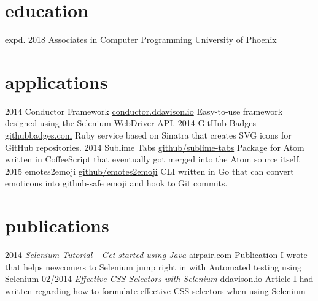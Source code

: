\documentclass[]{ddavison-resume}
\begin{document}
\section{education}

\begin{entrylist}
  \entry
    {expd. 2018}
    {Associates {\normalfont in Computer Programming}}
    {University of Phoenix}
    {}
\end{entrylist}

\section{applications}

\begin{entrylist}
  \entry
    {2014}
    {Conductor Framework}
    {\href{https://conductor.ddavison.io}{conductor.ddavison.io}}
    {Easy-to-use framework designed using the Selenium WebDriver API.}
  \entry
    {2014}
    {GitHub Badges}
    {\href{https://github.com/ddavison/github-badges}{githubbadges.com}}
    {Ruby service based on Sinatra that creates SVG icons for GitHub repositories.}
  \entry
    {2014}
    {Sublime Tabs}
    {\href{https://github.com/ddavison/sublime-tabs}{github/sublime-tabs}}
    {Package for Atom written in CoffeeScript that eventually got merged into the Atom source itself.}
  \entry
  	{2015}
  	{emotes2emoji}
  	{\href{https://github.com/ddavison/emotes2emoji}{github/emotes2emoji}}
  	{CLI written in Go that can convert emoticons  into github-safe emoji and hook to Git commits.}
\end{entrylist}

\section{publications}

\begin{entrylist}
  \entry
  	{2014}
  	{\emph{Selenium Tutorial - Get started using Java}}
  	{\href{https://www.airpair.com/selenium/posts/selenium-tutorial-with-java}{airpair.com}}
  	{Publication I wrote that helps newcomers to Selenium jump right in with Automated testing using Selenium}
  \entry
  	{02/2014}
  	{\emph{Effective CSS Selectors with Selenium}}
  	{\href{https://ddavison.io/css/2014/02/18/effective-css-selectors.html}{ddavison.io}}
  	{Article I had written regarding how to formulate effective CSS selectors when using Selenium}
\end{entrylist}
\end{document}
